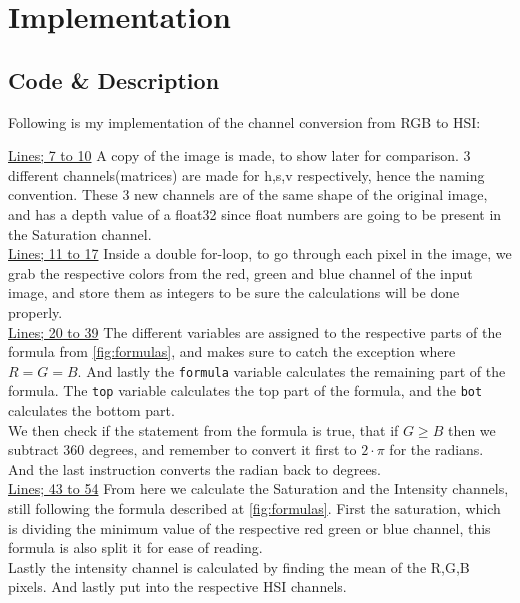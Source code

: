 \documentclass{article}
\begin{document}
\section{Implementation}
\subsection{Code \& Description}
Following is my implementation of the channel conversion from RGB to HSI:


\underline{Lines; 7 to 10} %
A copy of the image is made, to show later for comparison. 3 different channels(matrices) are made for h,s,v respectively, hence the naming convention. These 3 new channels are of the same shape of the original image, and has a depth value of a float32 since float numbers are going to be present in the Saturation channel.\medskip \\
\underline{Lines; 11 to 17} %
Inside a double for-loop, to go through each pixel in the image, we grab the respective colors from the red, green and blue channel of the input image, and store them as integers to be sure the calculations will be done properly.\medskip \\
\underline{Lines; 20 to 39} %
The different variables are assigned to the respective parts of the formula from \autoref{fig:formulas}, and makes sure to catch the exception where $R = G = B$. And lastly the \texttt{formula} variable calculates the remaining part of the formula. The \texttt{top} variable calculates the top part of the formula, and the \texttt{bot} calculates the bottom part.\\
We then check if the statement from the formula is true, that if $ G \ge B$ then we subtract 360 degrees, and remember to convert it first to $2\cdot\pi$ for the radians.\\
And the last instruction converts the radian back to degrees.\medskip \\
\underline{Lines; 43 to 54}
From here we calculate the Saturation and the Intensity channels, still following the formula described at \autoref{fig:formulas}.
First the saturation, which is dividing the minimum value of the respective red green or blue channel, this formula is also split it for ease of reading.\\
Lastly the intensity channel is calculated by finding the mean of the R,G,B pixels. And lastly put into the respective HSI channels.
\end{document}
